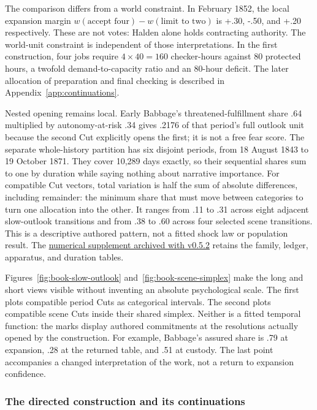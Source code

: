 \documentclass[11pt,a4paper]{article}
\begin{document}
The comparison differs from a world constraint. In February 1852, the local expansion
margin $w(\text{accept four})-w(\text{limit to two})$ is +.30, -.50, and +.20
respectively. These are not votes: Halden alone holds contracting authority.
The world-unit constraint is independent of those interpretations. In the
first construction, four jobs require $4\times40=160$ checker-hours against
80 protected hours, a twofold demand-to-capacity ratio and an 80-hour deficit.
The later allocation of preparation and final checking is described in
Appendix~\ref{app:continuations}.

Nested opening remains local. Early Babbage's threatened-fulfillment share .64
multiplied by autonomy-at-risk .34 gives .2176 of that period's full outlook
unit because the second Cut explicitly opens the first; it is not a free fear
score. The separate whole-history partition has six disjoint periods, from
18 August 1843 to 19 October 1871. They cover 10,289 days exactly, so their sequential
shares sum to one by duration while saying nothing about narrative importance.
For compatible Cut vectors, total variation is half the sum of absolute
differences, including remainder: the minimum share that must move between
categories to turn one allocation into the other. It ranges from .11 to .31
across eight adjacent slow-outlook transitions and from .38 to .60 across four
selected scene transitions. This is a descriptive authored pattern, not a fitted
shock law or population result. The
\href{https://github.com/emergent-wisdom/meaning-model/blob/v0.5.2/examples/book-of-conditions/NUMERICAL-STATISTICS.md}{numerical supplement archived with v0.5.2}
retains the family, ledger, apparatus, and duration tables.

Figures~\ref{fig:book-slow-outlook} and~\ref{fig:book-scene-simplex} make the
long and short views visible without inventing an absolute psychological
scale. The first plots compatible period Cuts as categorical intervals. The
second plots compatible scene Cuts inside their shared simplex. Neither is a
fitted temporal function: the marks display authored commitments at the
resolutions actually opened by the construction.
For example, Babbage's assured share is .79 at expansion, .28 at the returned
table, and .51 at custody. The last point accompanies a changed interpretation
of the work, not a return to expansion confidence.



\subsubsection{The directed construction and its continuations}
\label{sec:story-continuations}
\end{document}
